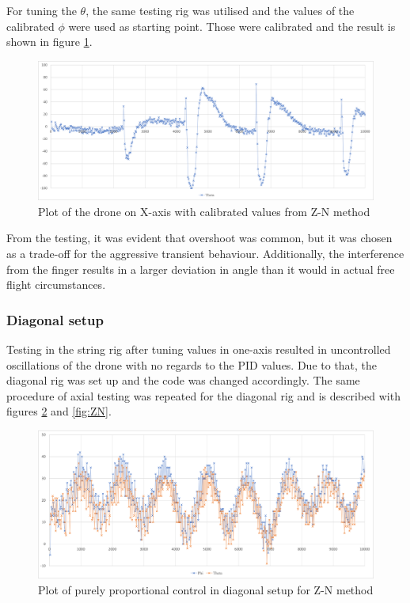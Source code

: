 For tuning the $\theta$, the same testing rig was utilised and the values of the calibrated $\phi$ were used as starting point. Those were calibrated and the result is shown in figure \ref{fig:Theta_ZN}.

\begin{figure}[h!]
    \centering
    \includegraphics[width=\textwidth]{pictures/graphs/ThetaZN_00004.png}
    \caption{Plot of the drone on X-axis with calibrated values from Z-N method}
    \label{fig:Theta_ZN}
\end{figure}

From the testing, it was evident that overshoot was common, but it was chosen as a trade-off for the aggressive transient behaviour. Additionally, the interference from the finger results in a larger deviation in angle than it would in actual free flight circumstances.
\newpage

\subsubsection{Diagonal setup}

Testing in the string rig after tuning values in one-axis resulted in uncontrolled oscillations of the drone with no regards to the PID values. Due to that, the diagonal rig was set up and the code was changed accordingly.
The same procedure of axial testing was repeated for the diagonal rig and is described with figures \ref{fig:diagonal} and \ref{fig:ZN}.

\begin{figure}[h!]
    \centering
    \includegraphics[width=\textwidth]{pictures/graphs/Diagonal_P0004.png}
    \caption{Plot of purely proportional control in diagonal setup for Z-N method}
    \label{fig:diagonal}
\end{figure}

